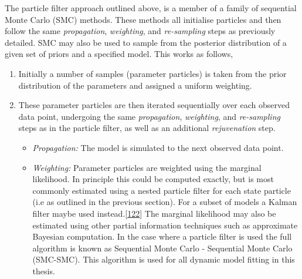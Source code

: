 \documentclass[11pt,twoside]{bristolthesis}
\begin{document}
  The particle filter approach outlined above, is a member of a family of sequential Monte Carlo (SMC) methods. These methods all initialise particles and then follow the same \emph{propagation}, \emph{weighting}, and \emph{re-sampling} steps as previously detailed. SMC may also be used to sample from the posterior distribution of a given set of priors and a specified model. This works as follows,
  \begin{enumerate}
  \def\labelenumi{\arabic{enumi}.}
  \item
    Initially a number of samples (parameter particles) is taken from the prior distribution of the parameters and assigned a uniform weighting.
  \item
    These parameter particles are then iterated sequentially over each observed data point, undergoing the same \emph{propagation}, \emph{weighting}, and \emph{re-sampling} steps as in the particle filter, as well as an additional \emph{rejuvenation} step.
    \begin{itemize}
    \item
      \emph{Propagation:} The model is simulated to the next observed data point.
    \item
      \emph{Weighting:} Parameter particles are weighted using the marginal likelihood. In principle this could be computed exactly, but is most commonly estimated using a nested particle filter for each state particle (i.e as outlined in the previous section). For a subset of models a Kalman filter maybe used instead.{[}\protect\hyperlink{ref-Murray2015}{122}{]} The marginal likelihood may also be estimated using other partial information techniques such as approximate Bayesian computation. In the case where a particle filter is used the full algorithm is known as Sequential Monte Carlo - Sequential Monte Carlo (SMC-SMC). This algorithm is used for all dynamic model fitting in this thesis.
    \end{itemize}
  \end{enumerate}
\end{document}
